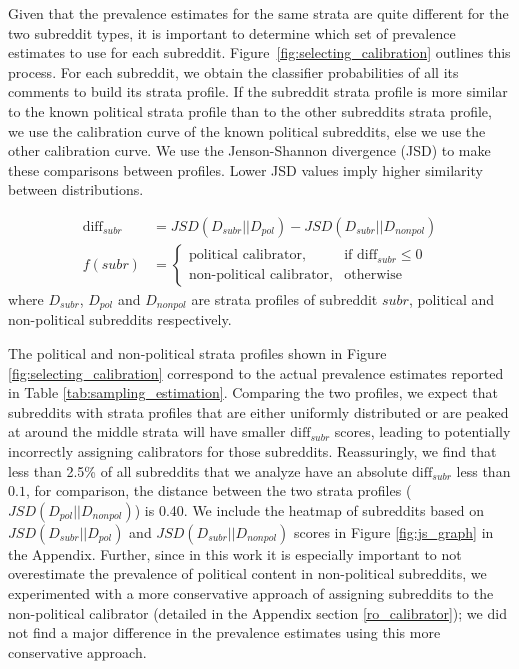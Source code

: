 \documentclass[letterpaper]{article} %
\begin{document}
Given that the prevalence estimates for the same strata are quite different for the two subreddit types, it is important to determine which set of prevalence estimates to use for each subreddit. Figure~\ref{fig:selecting_calibration} outlines this process. For each subreddit, we obtain the classifier probabilities of all its comments to build its strata profile. If the subreddit strata profile is more similar to the known political strata profile than to the other subreddits strata profile, we use the calibration curve of the known political subreddits, else we use the other calibration curve. We use the Jenson-Shannon divergence (JSD) to make these comparisons between profiles. Lower JSD values imply higher similarity between distributions.

\begin{align*}
\text{diff}_{subr} &= JSD(D_{subr}||D_{pol}) - JSD(D_{subr}||D_{nonpol})\\
 f(subr) &= 
\begin{cases}
    \text{political calibrator},& \text{if } \text{diff}_{subr} \le 0 \\
    \text{non-political calibrator},  & \text{otherwise}
\end{cases}
\end{align*}
where $D_{subr}$, $D_{pol}$ and $D_{nonpol}$ are strata profiles of subreddit $subr$, political and non-political subreddits respectively.

The political and non-political strata profiles shown in Figure \ref{fig:selecting_calibration} correspond to the actual prevalence estimates reported in Table \ref{tab:sampling_estimation}. Comparing the two profiles, we expect that subreddits with strata profiles that are either uniformly distributed or are peaked at around the middle strata will have smaller $\text{diff}_{subr}$ scores, leading to potentially incorrectly assigning calibrators for those subreddits. Reassuringly, we find that less than 2.5\% of all subreddits that we analyze have an absolute $\text{diff}_{subr}$ less than $0.1$, for comparison, the distance between the two strata profiles ($JSD(D_{pol}||D_{nonpol})$) is 0.40. We include the heatmap of subreddits based on $JSD(D_{subr}||D_{pol})$ and $JSD(D_{subr}||D_{nonpol})$ scores in Figure \ref{fig:js_graph} in the Appendix. Further, since in this work it is especially important to not overestimate the prevalence of political content in non-political subreddits, we experimented with a more conservative approach of assigning subreddits to the non-political calibrator (detailed in the Appendix section \ref{ro_calibrator}); we did not find a major difference in the prevalence estimates using this more conservative approach.
\end{document}
